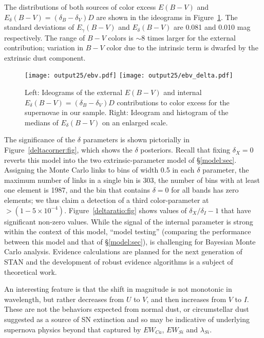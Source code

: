 \documentclass{aastex61}   	%
\begin{document}
The distributions of both sources of color excess $E(B-V)$ and
 $E_\delta(B-V) = (\delta_B-\delta_V)D$ are shown in the ideograms in Figure~\ref{ebv:fig}.
The standard deviations of $E_\gamma(B-V)$ and $E_\delta(B-V)$ are
0.081
and 0.010
mag respectively.
The range of $B-V$ colors is $\sim 8$ times larger for the external contribution; variation in $B-V$ color due to the intrinsic term is dwarfed by the extrinsic dust
component. 

\begin{figure}[htbp] %
   \centering
   \texttt{[image: output25/ebv.pdf]}
   \texttt{[image: output25/ebv\_delta.pdf]}
      \caption{Left: Ideograms of the external $E(B-V)$ and
   internal $E_\delta(B-V) = (\delta_B-\delta_V)D$  contributions to color excess  for the supernovae in our sample.
   Right: Ideogram and histogram of the medians of $E_\delta(B-V)$ on an enlarged scale.
   \label{ebv:fig}}
\end{figure}
The significance of the $\delta$ parameters is shown pictorially in
Figure~\ref{deltacorner:fig}, which shows the $\delta$ posteriors.
Recall that fixing $\delta_X=0$ reverts this model into the two extrinsic-parameter model of \S\ref{model:sec}.
Assigning the Monte Carlo links to bins of width 0.5 in each $\delta$ parameter, the maximum number of links in a single bin is 303, the number of bins
with at least one element is 1987, and the bin that contains $\delta=0$ for all bands has zero elements; we thus claim a detection
of a third color-parameter at $> (1-5\times 10^{-4})$.
Figure~\ref{deltaratio:fig} shows  values of $\delta_X/\delta_I-1$ that  have significant non-zero values.
While the signal of the internal parameter is strong within the context of this model, ``model testing'' (comparing the
performance  between this model
and that of \S\ref{model:sec}), is challenging for Bayesian Monte Carlo analysis.  Evidence calculations are planned
for the next generation of STAN and the development of robust evidence algorithms is a subject of theoretical work.

An interesting feature
is that the shift in magnitude is not monotonic in wavelength, but rather decreases from $U$ to $V$, and then increases from $V$
to $I$.
These are not the behaviors expected from normal dust, or
circumstellar dust suggested as a source of SN extinction \citep{2005ApJ...635L..33W,2008ApJ...686L.103G,
2015ApJ...807L..26G} and so may be indicative of underlying supernova physics beyond that captured by $EW_{Ca}$, $EW_{Si}$ and
$\lambda_{Si}$.
\end{document}
